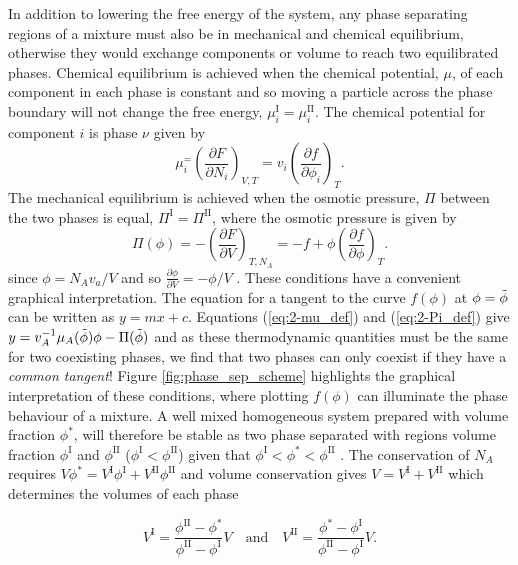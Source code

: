 In addition to lowering the free energy of the system, any phase separating regions of a mixture must also be in mechanical and chemical equilibrium, otherwise they would exchange components or volume to reach two equilibrated phases. Chemical equilibrium is achieved when the chemical potential, $\mu$, of each component in each phase is constant and so moving a particle across the phase boundary will not change the free energy, $\mu_i^{\mathrm{I}}=\mu_i^{\mathrm{II}}$. The chemical potential for component $i$ is phase $\nu$ given by
\begin{equation}
    \mu_i^ = \left(\frac{\partial F}{\partial N_i}\right)_{V, T} = v_i \left(\frac{\partial f}{\partial \phi_i}\right)_{T}.
    \label{eq:2-mu_def}
\end{equation}
The mechanical equilibrium is achieved when the osmotic pressure, $\Pi$ between the two phases is equal, $\Pi^{\mathrm{I}}=\Pi^{\mathrm{II}}$, where the osmotic pressure is given by
\begin{equation}
    \Pi(\phi) = -\left(\frac{\partial F}{\partial V}\right)_{T, N_A} = -f + \phi \left(\frac{\partial f}{\partial \phi}\right)_{T}.
    \label{eq:2-Pi_def}
\end{equation}
since $\phi = N_A v_a/V$ and so $\frac{\partial \phi}{\partial V} = -\phi/V$ \cite{doi_soft_2013}. These conditions have a convenient graphical interpretation. The equation for a tangent to the curve $f(\phi)$ at $\phi=\Tilde{\phi}$ can be written as $y=mx+c$. Equations (\ref{eq:2-mu_def}) and (\ref{eq:2-Pi_def}) give $y=v_A^{-1}\mu_A(\Tilde{\phi})\phi - \Pi(\Tilde{\phi})$ and as these thermodynamic quantities must be the same for two coexisting phases, we find that two phases can only coexist if they have a \textit{common tangent}! Figure \ref{fig:phase_sep_scheme} highlights the graphical interpretation of these conditions, where plotting $f(\phi)$ can illuminate the phase behaviour of a mixture. A well mixed homogeneous system prepared with volume fraction $\phi^*$, will therefore be stable as two phase separated with regions volume fraction $\phi^{\mathrm{I}}$ and $\phi^{\mathrm{II}}$ ($\phi^{\mathrm{I}} < \phi^{\mathrm{II}}$) given that $\phi^{\mathrm{I}} < \phi^* < \phi^{\mathrm{II}}$ \cite{weber2019physics}. The conservation of $N_A$ requires $V\phi^* = V^{\mathrm{I}}\phi^{\mathrm{I}} +V^{\mathrm{II}}\phi^{\mathrm{II}}$ and volume conservation gives $V = V^{\mathrm{I}}+V^{\mathrm{II}}$ which determines the volumes of each phase

\begin{equation}
    V^{\mathrm{I}} = \frac{\phi^{\mathrm{II}}-\phi^*}{\phi^{\mathrm{II}}-\phi^{\mathrm{I}}}V
    \quad
    \textrm{and}
    \quad
    V^{\mathrm{II}} = \frac{\phi^*-\phi^{\mathrm{I}}}{\phi^{\mathrm{II}}-\phi^{\mathrm{I}}}V.
\end{equation}


